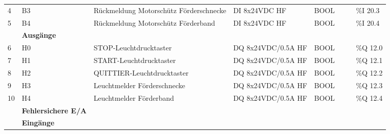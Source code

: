 \begin{table}[H]
\begin{longtable}{|llllllll|}
        \multicolumn{1}{|l|}{4} & \multicolumn{1}{l|}{B3} & \multicolumn{1}{l|}{Rückmeldung Motorschütz Förderschnecke} & \multicolumn{1}{l|}{DI 8x24VDC HF} & \multicolumn{1}{l|}{BOOL} & \multicolumn{1}{l|}{} & \multicolumn{1}{l|}{} & \%I 20.3 \\
        \multicolumn{1}{|l|}{5} & \multicolumn{1}{l|}{B4} & \multicolumn{1}{l|}{Rückmeldung Motorschütz Förderband} & \multicolumn{1}{l|}{DI 8x24VDC HF} & \multicolumn{1}{l|}{BOOL} & \multicolumn{1}{l|}{} & \multicolumn{1}{l|}{} & \%I 20.4 \\ \hline
        \rowcolor{lightGrey}
        & \multicolumn{7}{l|}{\textbf{Ausgänge}} \\ \hline
        \multicolumn{1}{|l|}{6} & \multicolumn{1}{l|}{H0} & \multicolumn{1}{l|}{STOP-Leuchtdrucktaster} & \multicolumn{1}{l|}{DQ 8x24VDC/0.5A HF} & \multicolumn{1}{l|}{BOOL} & \multicolumn{1}{l|}{}      & \multicolumn{1}{l|}{} & \%Q 12.0 \\
        \multicolumn{1}{|l|}{7} & \multicolumn{1}{l|}{H1} & \multicolumn{1}{l|}{START-Leuchtdrucktaster} & \multicolumn{1}{l|}{DQ 8x24VDC/0.5A HF} & \multicolumn{1}{l|}{BOOL} & \multicolumn{1}{l|}{}      & \multicolumn{1}{l|}{} & \%Q 12.1 \\
        \multicolumn{1}{|l|}{8} & \multicolumn{1}{l|}{H2} & \multicolumn{1}{l|}{QUITTIER-Leuchtdrucktaster} & \multicolumn{1}{l|}{DQ 8x24VDC/0.5A HF} & \multicolumn{1}{l|}{BOOL} & \multicolumn{1}{l|}{} & \multicolumn{1}{l|}{} & \%Q 12.2 \\
        \multicolumn{1}{|l|}{9} & \multicolumn{1}{l|}{H3} & \multicolumn{1}{l|}{Leuchtmelder Förderschnecke} & \multicolumn{1}{l|}{DQ 8x24VDC/0.5A HF} & \multicolumn{1}{l|}{BOOL} & \multicolumn{1}{l|}{} & \multicolumn{1}{l|}{} & \%Q 12.3 \\
        \multicolumn{1}{|l|}{10} & \multicolumn{1}{l|}{H4} & \multicolumn{1}{l|}{Leuchtmelder Förderband} & \multicolumn{1}{l|}{DQ 8x24VDC/0.5A HF} & \multicolumn{1}{l|}{BOOL} & \multicolumn{1}{l|}{}      & \multicolumn{1}{l|}{} & \%Q 12.4 \\ \hline
        \rowcolor{grey}
        \multicolumn{3}{|l}{} & \textbf{Fehlersichere E/A} & \multicolumn{4}{l|}{} \\ \hline
        \rowcolor{lightGrey}
        & \multicolumn{7}{l|}{\textbf{Eingänge}} \\ \hline

\end{longtable}
\end{table}
